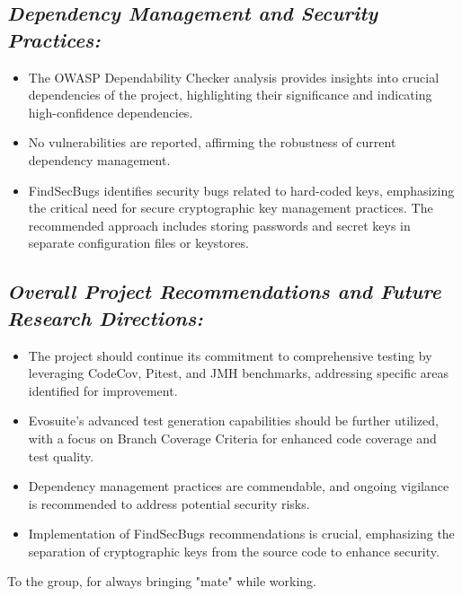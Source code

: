\documentclass[sigconf]{acmart}
\begin{document}
\subsection{\textbf{\textit{Dependency Management and Security Practices:}}}
   \begin{itemize}
       \item The OWASP Dependability Checker analysis provides insights into crucial dependencies of the project, highlighting their significance and indicating high-confidence dependencies.
       \item No vulnerabilities are reported, affirming the robustness of current dependency management.
       \item FindSecBugs identifies security bugs related to hard-coded keys, emphasizing the critical need for secure cryptographic key management practices. The recommended approach includes storing passwords and secret keys in separate configuration files or keystores.
   \end{itemize}

\subsection{\textbf{\textit{Overall Project Recommendations and Future Research Directions:}}}
   \begin{itemize}
       \item The project should continue its commitment to comprehensive testing by leveraging CodeCov, Pitest, and JMH benchmarks, addressing specific areas identified for improvement.
       \item Evosuite's advanced test generation capabilities should be further utilized, with a focus on Branch Coverage Criteria for enhanced code coverage and test quality.
       \item Dependency management practices are commendable, and ongoing vigilance is recommended to address potential security risks.
       \item Implementation of FindSecBugs recommendations is crucial, emphasizing the separation of cryptographic keys from the source code to enhance security.
       
   \end{itemize}
\begin{acks}
To the group, for always bringing "mate" while working.
\end{acks}





\appendix
\end{document}

